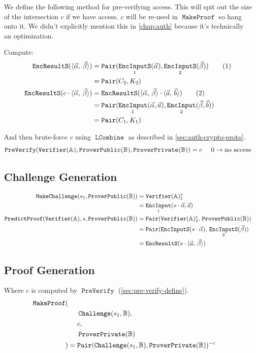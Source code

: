 \documentclass[pdftex,12pt,a4papaer,twoside,notitlepage]{report}
\newcommand{\iprod}[2]{\langle #1,\,#2\rangle}
\DeclareMathOperator{\ein}{\mathtt{EncInput}}
\DeclareMathOperator{\combine}{\mathtt{LCombine}}
\DeclareMathOperator{\eins}{\mathtt{EncInputS}}
\DeclareMathOperator{\eouts}{\mathtt{EncResultS}}
\DeclareMathOperator{\pair}{\mathtt{Pair}}
\DeclareMathOperator{\PreVerify}{\mathtt{PreVerify}}
\DeclareMathOperator{\mProof}{\mathtt{MakeProof}}
\DeclareMathOperator{\pProof}{\mathtt{PredictProof}}
\begin{document}
We define the following method for pre-verifying access. This will spit out the
size of the intersection $c$ if we have access. $c$ will be re-used in $\mProof$
so hang onto it. We didn't explicitly mention this in \cref{chap:auth} because
it's technically an optimization.

Compute:
\begin{align*}
  \eouts(\ABp)          &= \pair(\eins_1(\Ap), \eins_2(\Bp)) \tag{1} \\
                        &= \pair(C_2, K_2) \\
  \eouts(c \cdot \ABp)  &= \eouts(\ABp \cdot \iprod{\vec{a}}{\vec{b}}) \tag{2} \\
                        &= \pair(\ein_1(\Ap, \vec{a}), \ein_2(\Bp, \vec{b})) \\
                        &= \pair(C_1, K_1) \\
\end{align*}

And then brute-force $c$ using $\combine$ as described in \cref{sec:auth-crypto-proto}.
\begin{equation*}
  \PreVerify(\Vv, \Pv, \Sv) = c ~~~~0 \rightarrow\text{no access}
\end{equation*}

\subsection{Challenge Generation}

\begin{align*}
  \mCv &= \Vv_1^s \\
       &= \ein_1(s\cdot\Ap, \vec{a}) \\
\pProof(\Vv, s, \Pv) &= \pair(\Vv_2^s,\,\Pv) \\
      &= \pair(\eins(s\cdot \Ap),\,\eins_2(\Bp)) \\
      &= \eouts(s\cdot \ABp)
\end{align*}

\subsection{Proof Generation}

\begin{singlespace}
Where $c$ is computed by $\PreVerify$ (\cref{sec:pre-verify-define}).
\begin{align*}
  \mProof( \\
  &~~~~\Cv, \\
  &~~~~c, \\
  &~~~~\Sv \\
  ) &= \pair(\Cv, \Sv)^{-c}
\end{align*}
\end{singlespace}
\end{document}
